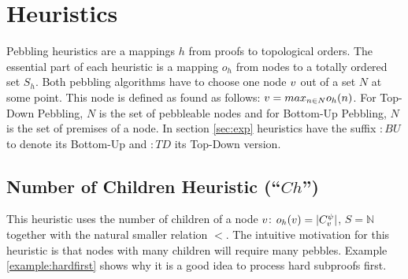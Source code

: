 \documentclass{llncs}
\begin{document}
\section{Heuristics}
\label{sec:heuristics}

Pebbling heuristics are a mappings $h$ from proofs to topological orders.
The essential part of each heuristic is a mapping $o_h$ from nodes to a totally ordered set $S_h$.
Both pebbling algorithms have to choose one node $v$ out of a set $N$ at some point. This node is defined as found as follows: $v = max_{n \in N} o_h(n)$.
For Top-Down Pebbling, $N$ is the set of pebbleable nodes and for Bottom-Up Pebbling, $N$ is the set of premises of a node.
In section \ref{sec:exp} heuristics have the suffix $:BU$ to denote its Bottom-Up and $:TD$ its Top-Down version.

\subsection{Number of Children Heuristic (``$Ch$'')}
\label{sec:children}
This heuristic uses the number of children of a node $v$: $o_h(v) = |C_{v}^{\psi}|$, $S = \mathbb{N}$ together with the natural smaller relation $<$.
The intuitive motivation for this heuristic is that nodes with many children will require many pebbles. Example \ref{example:hardfirst} shows why it is a good idea to process hard subproofs first.
\end{document}
